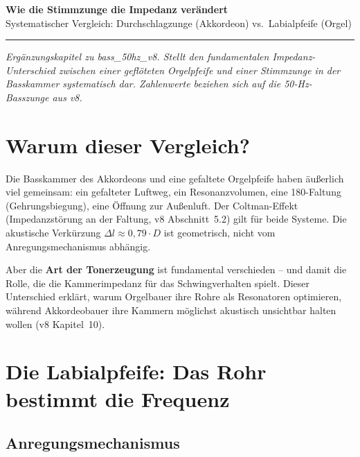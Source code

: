 \documentclass[11pt,a4paper]{article}
\begin{document}
\begin{center}
{\LARGE\bfseries\color{darkblue} Wie die Stimmzunge die Impedanz verändert}\\[6pt]
{\large Systematischer Vergleich: Durchschlagzunge (Akkordeon) vs.\ Labialpfeife (Orgel)}\\[4pt]
\textcolor{accentred}{\rule{0.8\textwidth}{2pt}}
\end{center}
{\small\itshape Ergänzungskapitel zu bass\_50hz\_v8. Stellt den fundamentalen Impedanz-Unterschied zwischen einer geflöteten Orgelpfeife und einer Stimmzunge in der Basskammer systematisch dar. Zahlenwerte beziehen sich auf die 50-Hz-Basszunge aus v8.}

\vspace{4mm}

\section{Warum dieser Vergleich?}

Die Basskammer des Akkordeons und eine gefaltete Orgelpfeife haben äußerlich viel gemeinsam: ein gefalteter Luftweg, ein Resonanzvolumen, eine 180\textdegree-Faltung (Gehrungsbiegung), eine Öffnung zur Außenluft. Der Coltman-Effekt (Impedanzstörung an der Faltung, v8 Abschnitt~5.2) gilt für beide Systeme. Die akustische Verkürzung $\Delta l \approx 0{,}79 \cdot D$ ist geometrisch, nicht vom Anregungsmechanismus abhängig.

Aber die \textbf{Art der Tonerzeugung} ist fundamental verschieden -- und damit die Rolle, die die Kammerimpedanz für das Schwingverhalten spielt. Dieser Unterschied erklärt, warum Orgelbauer ihre Rohre als Resonatoren optimieren, während Akkordeobauer ihre Kammern möglichst akustisch \glqq{}unsichtbar\grqq{} halten wollen (v8 Kapitel~10).

\section{Die Labialpfeife: Das Rohr bestimmt die Frequenz}

\subsection{Anregungsmechanismus}
\end{document}
